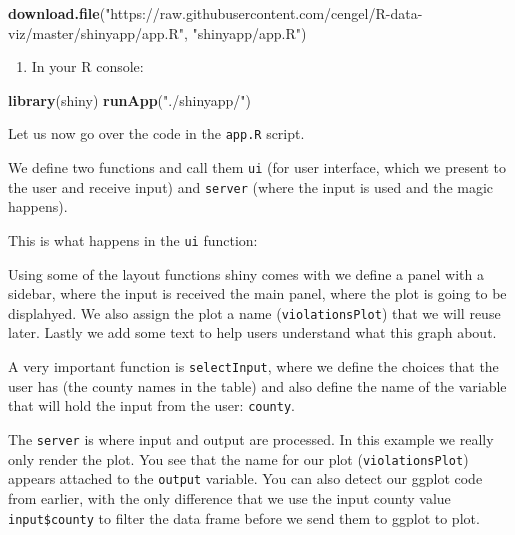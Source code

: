 \documentclass[]{book}
\newenvironment{Shaded}{\begin{snugshade}}{\end{snugshade}}
\newcommand{\KeywordTok}[1]{\textcolor[rgb]{0.13,0.29,0.53}{\textbf{#1}}}
\newcommand{\StringTok}[1]{\textcolor[rgb]{0.31,0.60,0.02}{#1}}
\newcommand{\NormalTok}[1]{#1}
\providecommand{\tightlist}{%
  \setlength{\itemsep}{0pt}\setlength{\parskip}{0pt}}
\theoremstyle{definition}
\theoremstyle{definition}
\theoremstyle{definition}
\theoremstyle{remark}
\begin{document}
\begin{Shaded}
\begin{Highlighting}[]
\KeywordTok{download.file}\NormalTok{(}\StringTok{"https://raw.githubusercontent.com/cengel/R-data-viz/master/shinyapp/app.R"}\NormalTok{, }\StringTok{"shinyapp/app.R"}\NormalTok{)}
\end{Highlighting}
\end{Shaded}

\begin{enumerate}
\def\labelenumi{\arabic{enumi}.}
\setcounter{enumi}{3}
\tightlist
\item
  In your R console:
\end{enumerate}

\begin{Shaded}
\begin{Highlighting}[]
\KeywordTok{library}\NormalTok{(shiny)}
\KeywordTok{runApp}\NormalTok{(}\StringTok{"./shinyapp/"}\NormalTok{)}
\end{Highlighting}
\end{Shaded}

Let us now go over the code in the \texttt{app.R} script.

We define two functions and call them \texttt{ui} (for user interface,
which we present to the user and receive input) and \texttt{server}
(where the input is used and the magic happens).

This is what happens in the \texttt{ui} function:

Using some of the layout functions shiny comes with we define a panel
with a sidebar, where the input is received the main panel, where the
plot is going to be displahyed. We also assign the plot a name
(\texttt{violationsPlot}) that we will reuse later. Lastly we add some
text to help users understand what this graph about.

A very important function is \texttt{selectInput}, where we define the
choices that the user has (the county names in the table) and also
define the name of the variable that will hold the input from the user:
\texttt{county}.

The \texttt{server} is where input and output are processed. In this
example we really only render the plot. You see that the name for our
plot (\texttt{violationsPlot}) appears attached to the \texttt{output}
variable. You can also detect our ggplot code from earlier, with the
only difference that we use the input county value
\texttt{input\$county} to filter the data frame before we send them to
ggplot to plot.
\end{document}

